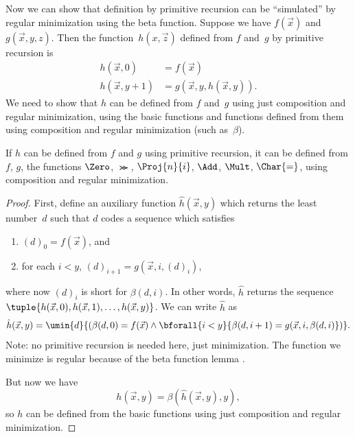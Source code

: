 \documentclass[../../../include/open-logic-section]{subfiles}
\begin{document}

Now we can show that definition by primitive recursion can be
``simulated'' by regular minimization using the beta function. Suppose
we have $f(\vec x)$ and $g(\vec x, y, z)$. Then the function~$h(x,\vec
z)$ defined from $f$ and~$g$ by primitive recursion is
\begin{align*}
h(\vec x, 0) & =  f(\vec x) \\
h(\vec x, y+1) & =  g(\vec x, y, h(\vec x, y)).
\end{align*}
We need to show that $h$ can be defined from $f$ and~$g$ using just
composition and regular minimization, using the basic functions and
functions defined from them using composition and regular minimization
(such as~$\beta$).

\begin{lem}
If $h$ can be defined from $f$ and $g$ using primitive recursion, it
can be defined from $f$, $g$, the functions $\Zero$, $\Succ$,
$\Proj{n}{i}$, $\Add$, $\Mult$, $\Char{=}$, using composition and
regular minimization.
\end{lem}

\begin{proof}
First, define an auxiliary function $\hat h(\vec x, y)$ which returns
the least number~$d$ such that $d$ codes a sequence which satisfies
\begin{enumerate}
\item $(d)_0 = f(\vec x)$, and
\item for each $i < y$, $(d)_{i+1} = g(\vec x, i, (d)_i)$,
\end{enumerate}
where now $(d)_i$ is short for $\beta(d,i)$. In other words, $\hat h$
returns the sequence $\tuple{h(\vec x, 0), h(\vec x, 1), \dots, h(\vec
x, y)}$. We can write $\hat h$ as
\[
\hat h(\vec x, y) = \umin{d}{(\beta(d,0) = f(\vec x) \land \bforall{i <
  y}{\beta(d,i+1) = g(\vec x, i,\beta(d,i)})}.
\]
Note: no primitive recursion is needed here, just minimization. The
function we minimize is regular because of the beta function lemma
.

But now we have
\[
h(\vec x, y) = \beta(\hat h(\vec x, y), y),
\]
so $h$ can be defined from the basic functions using just composition
and regular minimization.
\end{proof}
\end{document}
